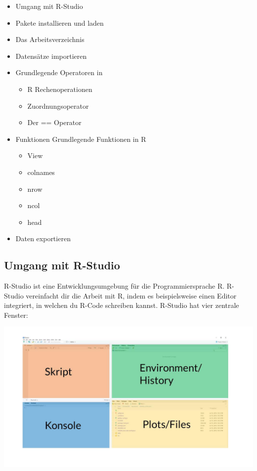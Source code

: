 \documentclass[
]{book}
\begin{document}
\begin{itemize}
\item
  Umgang mit R-Studio
\item
  Pakete installieren und laden
\item
  Das Arbeitsverzeichnis
\item
  Datensätze importieren
\item
  Grundlegende Operatoren in

  \begin{itemize}
  \item
    R Rechenoperationen
  \item
    Zuordnungsoperator
  \item
    Der == Operator
  \end{itemize}
\item
  Funktionen Grundlegende Funktionen in R

  \begin{itemize}
  \item
    View
  \item
    colnames
  \item
    nrow
  \item
    ncol
  \item
    head
  \end{itemize}
\item
  Daten exportieren
\end{itemize}

\hypertarget{umgang-mit-r-studio}{%
\subsection{Umgang mit R-Studio}\label{umgang-mit-r-studio}}

R-Studio ist eine Entwicklungsumgebung für die Programmiersprache R. R-Studio vereinfacht dir die Arbeit mit R, indem es beispielsweise einen Editor integriert, in welchen du R-Code schreiben kannst. R-Studio hat vier zentrale Fenster:

\includegraphics{images/02_grundlagen/rstudio_panels.jpg}
\end{document}
